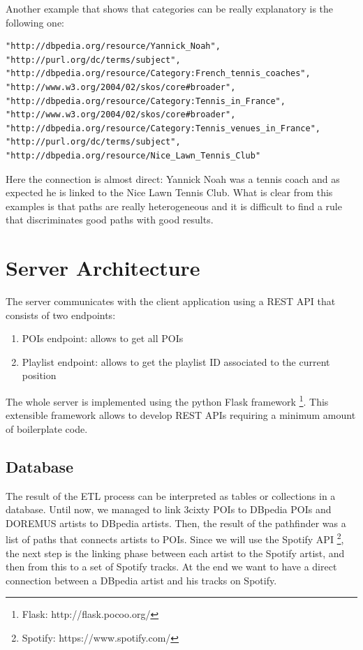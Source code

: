\documentclass[paper=a4, fontsize=11pt]{scrartcl}
\begin{document}
Another example that shows that categories can be really explanatory is the following one:
\begin{lstlisting}
"http://dbpedia.org/resource/Yannick_Noah", 
"http://purl.org/dc/terms/subject",   
"http://dbpedia.org/resource/Category:French_tennis_coaches", 
"http://www.w3.org/2004/02/skos/core#broader", 
"http://dbpedia.org/resource/Category:Tennis_in_France", 
"http://www.w3.org/2004/02/skos/core#broader", 
"http://dbpedia.org/resource/Category:Tennis_venues_in_France", 
"http://purl.org/dc/terms/subject", 
"http://dbpedia.org/resource/Nice_Lawn_Tennis_Club"
\end{lstlisting}

Here the connection is almost direct: Yannick Noah was a tennis coach and as expected he is linked to the Nice Lawn Tennis Club.
What is clear from this examples is that paths are really heterogeneous and it is difficult to find a rule that discriminates good paths with good results.


\section{Server Architecture}
The server communicates with the client application using a REST API that consists of two endpoints:
\begin{enumerate}
\item POIs endpoint: allows to get all POIs
\item Playlist endpoint: allows to get the playlist ID associated to the current position
\end{enumerate}
The whole server is implemented using the python Flask framework \footnote{Flask: http://flask.pocoo.org/}. This extensible framework allows to develop REST APIs requiring a minimum amount of boilerplate code.

\subsection{Database}
The result of the ETL process can be interpreted as tables or collections in a database.
Until now, we managed to link 3cixty POIs to DBpedia POIs and DOREMUS artists to DBpedia artists. Then, the result of the pathfinder was a list of paths that connects artists to POIs.
Since we will use the Spotify API \footnote{Spotify: https://www.spotify.com/}, the next step is the linking phase between each artist to the Spotify artist, and then from this to a set of Spotify tracks.
At the end we want to have a direct connection between a DBpedia artist and his tracks on Spotify.
\end{document}
